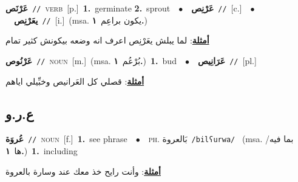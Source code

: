 \documentclass[10pt,a4paper,twoside]{article} %
\begin{document}
\begin{multicols}{2}
{\setlength\topsep{0pt}\textbf{\foreignlanguage{arabic}{عَرْنَص}}\ {\color{gray}\texttt{//}\color{black}}\ \textsc{verb}\ [p.]\ \textbf{1.}~germinate  \textbf{2.}~sprout\ \ $\bullet$\ \ \setlength\topsep{0pt}\textbf{\foreignlanguage{arabic}{عَرْنِص}}\ {\color{gray}\texttt{//}\color{black}}\ [c.]\ \ $\bullet$\ \ \setlength\topsep{0pt}\textbf{\foreignlanguage{arabic}{يعَرْنِص}}\ {\color{gray}\texttt{//}\color{black}}\ [i.]\ \color{gray}(msa. \foreignlanguage{arabic}{يكون براعِم}~\foreignlanguage{arabic}{\textbf{١.}})\color{black}\  \begin{flushright}\color{gray}\foreignlanguage{arabic}{\textbf{\underline{\foreignlanguage{arabic}{أمثلة}}}: لما يبلش يعَرْنِص اعرف انه وضعه بيكونش كثير تمام}\end{flushright}\color{black}} \vspace{2mm}

{\setlength\topsep{0pt}\textbf{\foreignlanguage{arabic}{عَرْنُوص}}\ {\color{gray}\texttt{//}\color{black}}\ \textsc{noun}\ [m.]\ \color{gray}(msa. \foreignlanguage{arabic}{بُرْعُم}~\foreignlanguage{arabic}{\textbf{١.}})\color{black}\ \textbf{1.}~bud\ \ $\bullet$\ \ \setlength\topsep{0pt}\textbf{\foreignlanguage{arabic}{عَرَانِيص}}\ {\color{gray}\texttt{//}\color{black}}\ [pl.]\  \begin{flushright}\color{gray}\foreignlanguage{arabic}{\textbf{\underline{\foreignlanguage{arabic}{أمثلة}}}: قصلي كل العَرانيص وخبِّيلي اياهم}\end{flushright}\color{black}} \vspace{2mm}

\vspace{-3mm}
\subsection*{\color{blue}\foreignlanguage{arabic}{ع.ر.و}\color{blue}{}} 

{\setlength\topsep{0pt}\textbf{\foreignlanguage{arabic}{عُروَة}}\ {\color{gray}\texttt{//}\color{black}}\ \textsc{noun}\ [f.]\ \textbf{1.}~see phrase\ \ $\bullet$\ \ \textsc{ph.} \color{gray} \foreignlanguage{arabic}{بَالعروة}\color{black}\ {\color{gray}\texttt{/{\sffamily bilʕurwa}/}\color{black}}\ \color{gray} (msa. \foreignlanguage{arabic}{بما فيه/ها}~\foreignlanguage{arabic}{\textbf{١.}})\color{black}\ \textbf{1.}~including\  \begin{flushright}\color{gray}\foreignlanguage{arabic}{\textbf{\underline{\foreignlanguage{arabic}{أمثلة}}}: وأنت رايح خذ معك عند وسارة بالعروة}\end{flushright}\color{black}} \vspace{2mm}


\end{multicols}
\end{document}
